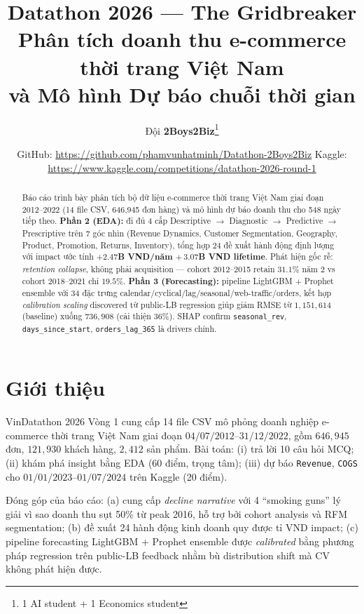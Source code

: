 \documentclass[10pt]{article}
\title{\textbf{Datathon 2026 --- The Gridbreaker}\\
\large Phân tích doanh thu e-commerce thời trang Việt Nam\\và Mô hình Dự báo chuỗi thời gian}
\author[1]{Đội \textbf{2Boys2Biz}\thanks{1 AI student + 1 Economics student}}
\affil[1]{VinDatathon 2026 --- Vòng 1 (Sơ loại)}
\date{%
  \small GitHub: \url{https://github.com/phamvunhatminh/Datathon-2Boys2Biz} \quad\textbar\quad
  Kaggle: \url{https://www.kaggle.com/competitions/datathon-2026-round-1}
}
\begin{document}
\maketitle

\begin{abstract}
\noindent Báo cáo trình bày phân tích bộ dữ liệu e-commerce thời trang Việt Nam giai đoạn 2012--2022 (14 file CSV, 646{,}945 đơn hàng) và mô hình dự báo doanh thu cho 548 ngày tiếp theo. \textbf{Phần 2 (EDA):} đi đủ 4 cấp Descriptive $\to$ Diagnostic $\to$ Predictive $\to$ Prescriptive trên 7 góc nhìn (Revenue Dynamics, Customer Segmentation, Geography, Product, Promotion, Returns, Inventory), tổng hợp 24 đề xuất hành động định lượng với impact ước tính \textbf{$+2.47$B VND/năm $+\,3.07$B VND lifetime}. Phát hiện gốc rễ: \emph{retention collapse}, không phải acquisition --- cohort 2012--2015 retain $31.1\%$ năm 2 vs cohort 2018--2021 chỉ $19.5\%$. \textbf{Phần 3 (Forecasting):} pipeline LightGBM + Prophet ensemble với 34 đặc trưng calendar/cyclical/lag/seasonal/web-traffic/orders, kết hợp \emph{calibration scaling} discovered từ public-LB regression giúp giảm RMSE từ $1{,}151{,}614$ (baseline) xuống \textbf{$736{,}908$} (cải thiện $36\%$). SHAP confirm \texttt{seasonal\_rev}, \texttt{days\_since\_start}, \texttt{orders\_lag\_365} là drivers chính.
\end{abstract}

\section{Giới thiệu}

VinDatathon 2026 Vòng 1 cung cấp 14 file CSV mô phỏng doanh nghiệp e-commerce thời trang Việt Nam giai đoạn $04/07/2012$--$31/12/2022$, gồm $646{,}945$ đơn, $121{,}930$ khách hàng, $2{,}412$ sản phẩm. Bài toán: (i) trả lời 10 câu hỏi MCQ; (ii) khám phá insight bằng EDA (60 điểm, trọng tâm); (iii) dự báo \texttt{Revenue}, \texttt{COGS} cho $01/01/2023$--$01/07/2024$ trên Kaggle (20 điểm).

Đóng góp của báo cáo: (a) cung cấp \emph{decline narrative} với 4 ``smoking guns'' lý giải vì sao doanh thu sụt 50\% từ peak 2016, hỗ trợ bởi cohort analysis và RFM segmentation; (b) đề xuất 24 hành động kinh doanh quy được tỉ VND impact; (c) pipeline forecasting LightGBM + Prophet ensemble được \emph{calibrated} bằng phương pháp regression trên public-LB feedback nhằm bù distribution shift mà CV không phát hiện được.
\end{document}
